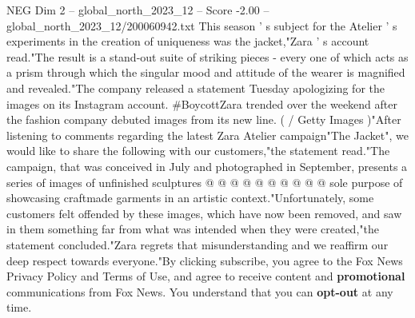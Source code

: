 \begin{textsample}{NEG Dim 2 – global\_north\_2023\_12 – Score -2.00 – global\_north\_2023\_12/200060942.txt}
This season ' s subject for the Atelier ' s experiments in the creation of uniqueness was the jacket,"Zara ' s account read."The result is a stand-out suite of striking pieces - every one of which acts as a prism through which the singular mood and attitude of the wearer is magnified and revealed."The company released a statement Tuesday apologizing for the images on its Instagram account. \#BoycottZara trended over the weekend after the fashion company debuted images from its new line. ( / Getty Images )"After listening to comments regarding the latest Zara Atelier campaign"The Jacket", we would like to share the following with our customers,"the statement read."The campaign, that was conceived in July and photographed in September, presents a series of images of unfinished sculptures @ @ @ @ @ @ @ @ @ @ sole purpose of showcasing craftmade garments in an artistic context."Unfortunately, some customers felt offended by these images, which have now been removed, and saw in them something far from what was intended when they were created,"the statement concluded."Zara regrets that misunderstanding and we reaffirm our deep respect towards everyone."By clicking subscribe, you agree to the Fox News Privacy Policy and Terms of Use, and agree to receive content and \textbf{promotional} communications from Fox News.
You understand that you can \textbf{opt-out} at any time.

\end{textsample}
